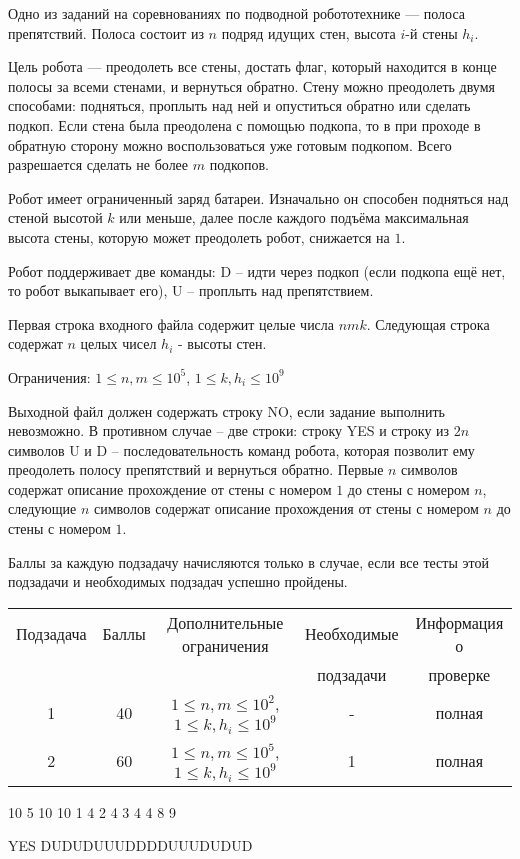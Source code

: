 
Одно из заданий на соревнованиях по подводной робототехнике — полоса препятствий. Полоса состоит из $n$ подряд идущих стен, высота $i$-й стены $h_i$. 

Цель робота — преодолеть все стены, достать флаг, который находится в конце полосы за всеми стенами, и вернуться обратно. Стену можно преодолеть двумя способами: подняться, проплыть над ней и опуститься обратно или сделать подкоп. Если стена была преодолена с помощью подкопа, то в при проходе в обратную сторону можно воспользоваться уже готовым подкопом. Всего разрешается сделать не более $m$ подкопов.

Робот имеет ограниченный заряд батареи. Изначально он способен подняться над стеной высотой $k$ или меньше, далее после каждого подъёма максимальная высота стены, которую может преодолеть робот, снижается на $1$. 

Робот поддерживает две команды: D -- идти через подкоп (если подкопа ещё нет, то робот выкапывает его), U -- проплыть над препятствием.


Первая строка входного файла содержит целые числа $n m k$.
Следующая строка содержат $n$ целых чисел $h_i$ - высоты стен.

Ограничения:
$1 \le n, m \le 10^5$, $1 \le k, h_i \le 10^9$

\outputfmtSection

Выходной файл должен содержать строку NO, если задание выполнить невозможно. В противном случае -- две строки: строку YES и строку из $2n$ символов U и D -- последовательность команд робота, которая позволит ему преодолеть полосу препятствий и вернуться обратно. Первые $n$ символов содержат описание прохождение от стены с номером $1$ до стены с номером $n$, следующие $n$ символов содержат описание прохождения от стены с номером $n$ до стены с номером $1$.

\markSection

Баллы за каждую подзадачу начисляются только в случае, если все тесты этой
подзадачи и необходимых подзадач успешно пройдены.

\begin{table}[h]
\small
\begin{tabular}{|c|c|c|c|c|}
        \hline
    Подзадача&Баллы&Дополнительные ограничения&Необходимые &Информация о  \\
            &     &                          &подзадачи   &проверке\\
            \hline
    1&40&$1 \le n, m \le 10^2$, $1 \le k, h_i \le 10^9$&-&полная\\


    2&60&$1 \le n, m \le 10^5$, $1 \le k, h_i \le 10^9$&1&полная\\
    \hline
\end{tabular}
\end{table}


\begin{myverbbox}[\small]{\vinput}
    10 5 10
    10 1 4 2 4 3 4 4 8 9
\end{myverbbox}
\begin{myverbbox}[\small]{\voutput}
    YES
    DUDUDUUUDDDDUUUDUDUD
\end{myverbbox}

